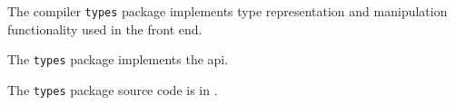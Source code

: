 
The compiler {\tt types} package implements type representation and manipulation 
functionality used in the front end.

The {\tt types} package implements the  api.

The {\tt types} package source code is in .


